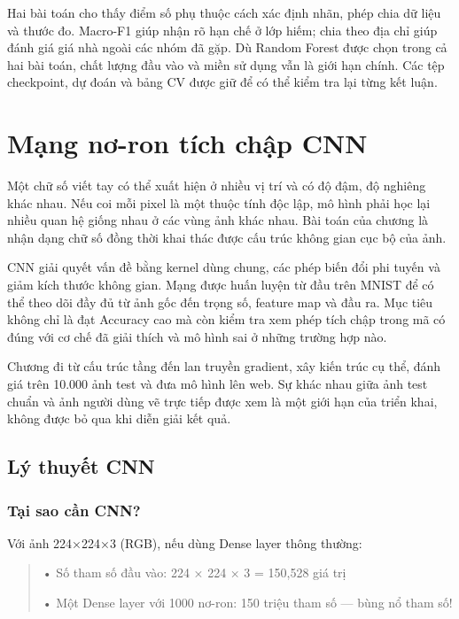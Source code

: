 Hai bài toán cho thấy điểm số phụ thuộc cách xác định nhãn, phép chia dữ
liệu và thước đo. Macro-F1 giúp nhận rõ hạn chế ở lớp hiếm; chia theo
địa chỉ giúp đánh giá giá nhà ngoài các nhóm đã gặp. Dù Random Forest
được chọn trong cả hai bài toán, chất lượng đầu vào và miền sử dụng vẫn
là giới hạn chính. Các tệp checkpoint, dự đoán và bảng CV được giữ để có
thể kiểm tra lại từng kết luận.

\chapter{Mạng nơ-ron tích chập CNN}\label{chux1b0ux1a1ng-3.-mux1ea1ng-nux1a1-ron-tuxedch-chux1eadp-CNN}

Một chữ số viết tay có thể xuất hiện ở nhiều vị trí và có độ đậm, độ
nghiêng khác nhau. Nếu coi mỗi pixel là một thuộc tính độc lập, mô hình
phải học lại nhiều quan hệ giống nhau ở các vùng ảnh khác nhau. Bài toán
của chương là nhận dạng chữ số đồng thời khai thác được cấu trúc không
gian cục bộ của ảnh.

CNN giải quyết vấn đề bằng kernel dùng chung, các phép biến đổi phi
tuyến và giảm kích thước không gian. Mạng được huấn luyện từ đầu trên
MNIST để có thể theo dõi đầy đủ từ ảnh gốc đến trọng số, feature map và
đầu ra. Mục tiêu không chỉ là đạt Accuracy cao mà còn kiểm tra xem phép
tích chập trong mã có đúng với cơ chế đã giải thích và mô hình sai ở
những trường hợp nào.

Chương đi từ cấu trúc tầng đến lan truyền gradient, xây kiến trúc cụ
thể, đánh giá trên 10.000 ảnh test và đưa mô hình lên web. Sự khác nhau
giữa ảnh test chuẩn và ảnh người dùng vẽ trực tiếp được xem là một giới
hạn của triển khai, không được bỏ qua khi diễn giải kết quả.

\section{Lý thuyết CNN}\label{luxfd-thuyux1ebft-CNN}

\subsection{Tại sao cần CNN?}\label{tux1ea1i-sao-cux1ea7n-CNN}

Với ảnh 224×224×3 (RGB), nếu dùng Dense layer thông thường:

\begin{quote}
• Số tham số đầu vào: 224 × 224 × 3 = 150,528 giá trị

• Một Dense layer với 1000 nơ-ron: 150 triệu tham số --- bùng nổ tham
số!
\end{quote}

